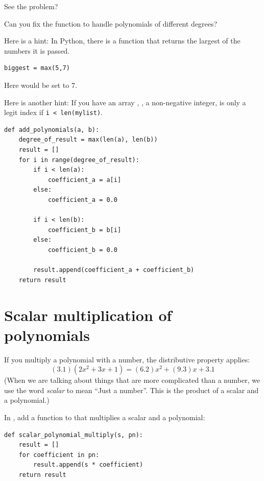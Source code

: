 See the problem?

\begin{Exercise}[title=Dealing with polynomials of different degrees, label=pyaddpolys]
  
Can you fix the function  to handle polynomials of different degrees?

Here is a hint: In Python, there is a  function that returns the largest of the numbers it is passed.
\begin{verbatim}
biggest = max(5,7)
\end{verbatim}
Here  would be set to 7.

Here is another hint: If you have an array , ,
a non-negative integer, is only a legit index if \texttt{i <
  len(mylist)}.
\end{Exercise}
\begin{Answer}[ref=pyaddpolys]
\begin{verbatim}
def add_polynomials(a, b):
    degree_of_result = max(len(a), len(b))
    result = []
    for i in range(degree_of_result):
        if i < len(a):
            coefficient_a = a[i]
        else:
            coefficient_a = 0.0   

        if i < len(b):
            coefficient_b = b[i]
        else:
            coefficient_b = 0.0
            
        result.append(coefficient_a + coefficient_b)
    return result
\end{verbatim}
\end{Answer}

\section{Scalar multiplication of  polynomials}

If you multiply a polynomial with a number, the distributive property applies:
\begin{equation*}
  (3.1)(2x^2 + 3x + 1) = (6.2)x^2 + (9.3)x + 3.1
\end{equation*}
(When we are talking about things that are more complicated than a number, we use the word \emph{scalar} to mean ``Just a number''. This is the product of a scalar and a polynomial.)

In , add a function to that multiplies a scalar and a polynomial:
\begin{verbatim}
def scalar_polynomial_multiply(s, pn):
    result = []
    for coefficient in pn:
        result.append(s * coefficient)
    return result
\end{verbatim}

